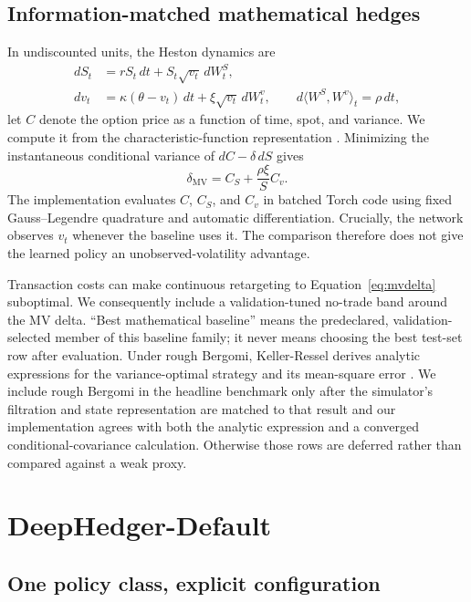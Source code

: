 \documentclass[sigconf,balance=false]{acmart}
\newcommand{\methodname}{DeepHedger-Default}
\begin{document}
\subsection{Information-matched mathematical hedges}

In undiscounted units, the Heston dynamics are
\begin{align}
 dS_t &= rS_t\,dt + S_t\sqrt{v_t}\,dW_t^S,\\
 dv_t &= \kappa(\theta-v_t)\,dt
       + \xi\sqrt{v_t}\,dW_t^v,\qquad
 d\langle W^S,W^v\rangle_t=\rho\,dt,
\end{align}
let $C$ denote the option price as a function of time, spot, and variance.
We compute it from the characteristic-function representation
\cite{heston1993closed}.  Minimizing the instantaneous
conditional variance of $dC-\delta\,dS$ gives
\begin{equation}
 \delta_{\mathrm{MV}}
 = C_S + \frac{\rho\xi}{S}C_v .
 \label{eq:mvdelta}
\end{equation}
The implementation evaluates $C$, $C_S$, and $C_v$ in batched Torch code using
fixed Gauss--Legendre quadrature and automatic differentiation.  Crucially, the
network observes $v_t$ whenever the baseline uses it.  The comparison therefore
does not give the learned policy an unobserved-volatility advantage.

Transaction costs can make continuous retargeting to
Equation~\eqref{eq:mvdelta} suboptimal.  We consequently include a
validation-tuned no-trade band around the MV delta.  ``Best mathematical
baseline'' means the predeclared, validation-selected member of this baseline
family; it never means choosing the best test-set row after evaluation.  Under
rough Bergomi, Keller-Ressel derives analytic expressions for the
variance-optimal strategy and its mean-square error
\cite{bayer2016rough,kellerressel2022bartlett}.  We include rough Bergomi in
the headline benchmark only after the simulator's filtration and state
representation are matched to that result and our implementation agrees with
both the analytic expression and a converged conditional-covariance
calculation.  Otherwise those rows are deferred rather than compared against a
weak proxy.

\section{\methodname}

\subsection{One policy class, explicit configuration}
\end{document}

